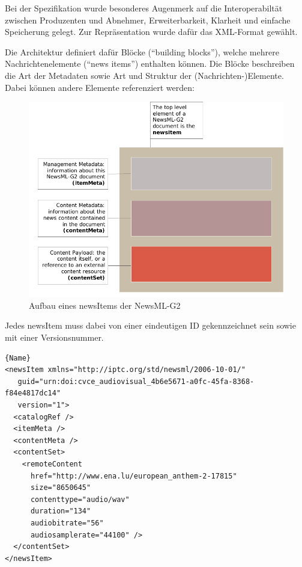 	Bei der Spezifikation wurde besonderes Augenmerk auf die Interoperabiltät zwischen Produzenten und Abnehmer, Erweiterbarkeit, Klarheit und einfache Speicherung gelegt. Zur Repräsentation wurde dafür das XML-Format gewählt.
	
	Die Architektur definiert dafür Blöcke (\enquote{building blocks}), welche mehrere Nachrichtenelemente (\enquote{news items}) enthalten können. Die Blöcke beschreiben die Art der Metadaten sowie Art und Struktur der (Nachrichten-)Elemente. Dabei können andere Elemente referenziert werden:
	
	\begin{figure}[htbp]
		\includegraphics[width=\columnwidth]{images/iptc_news_item.pdf}
		\caption{Aufbau eines newsItems der NewsML-G2}
		\label{myfigure}
	\end{figure}

	Jedes newsItem muss dabei von einer eindeutigen ID gekennzeichnet sein sowie mit einer Versionsnummer.

	\begin{lstlisting}[caption=Beispiel-XML IPTC NewsML-G2 für die Europäische Hymne]{Name}
<newsItem xmlns="http://iptc.org/std/newsml/2006-10-01/"
   guid="urn:doi:cvce_audiovisual_4b6e5671-a0fc-45fa-8368-f84e4817dc14"
   version="1">
  <catalogRef />
  <itemMeta />
  <contentMeta />
  <contentSet>
    <remoteContent
      href="http://www.ena.lu/european_anthem-2-17815"
      size="8650645"
      contenttype="audio/wav"
      duration="134"
      audiobitrate="56"
      audiosamplerate="44100" />
  </contentSet>
</newsItem>
	\end{lstlisting}


